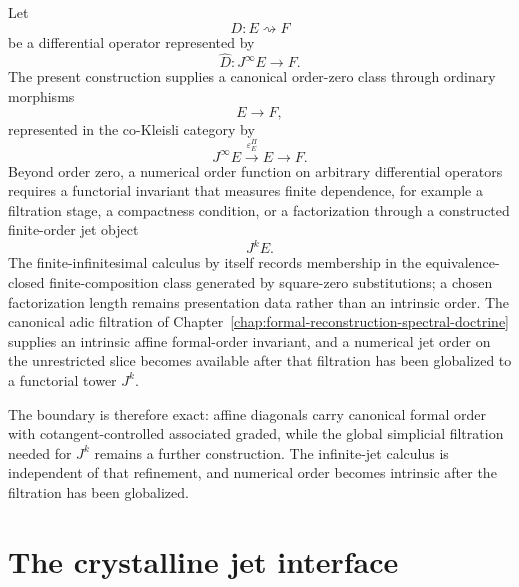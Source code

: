 \begin{remark}
\label{prop:finite-dependence-intrinsic}
Let
\[
  D:E\rightsquigarrow F
\]
be a differential operator represented by
\[
  \widehat D:J^\infty E\to F.
\]
The present construction supplies a canonical order-zero class through ordinary
morphisms
\[
  E\to F,
\]
represented in the co-Kleisli category by
\[
  J^\infty E\xrightarrow{\varepsilon^\Pi_E}E\to F.
\]
Beyond order zero, a numerical order function on arbitrary differential
operators requires a functorial invariant that measures finite dependence, for
example a filtration stage, a compactness condition, or a factorization
through a constructed finite-order jet object
\[
  J^kE.
\]
The finite-infinitesimal calculus by itself records membership in the
equivalence-closed finite-composition class generated by square-zero
substitutions; a chosen factorization length remains presentation data rather
than an intrinsic order. The canonical adic filtration of
Chapter~\ref{chap:formal-reconstruction-spectral-doctrine} supplies an
intrinsic affine formal-order invariant, and a numerical jet order on the
unrestricted slice becomes available after that filtration has been
globalized to a functorial tower \(J^k\).
\end{remark}

The boundary is therefore exact: affine diagonals carry canonical formal order
with cotangent-controlled associated graded, while the global simplicial
filtration needed for \(J^k\) remains a further construction. The infinite-jet
calculus is independent of that refinement, and numerical order becomes
intrinsic after the filtration has been globalized.

\section{The crystalline jet interface}
\label{sec:crystalline-jet-package}

